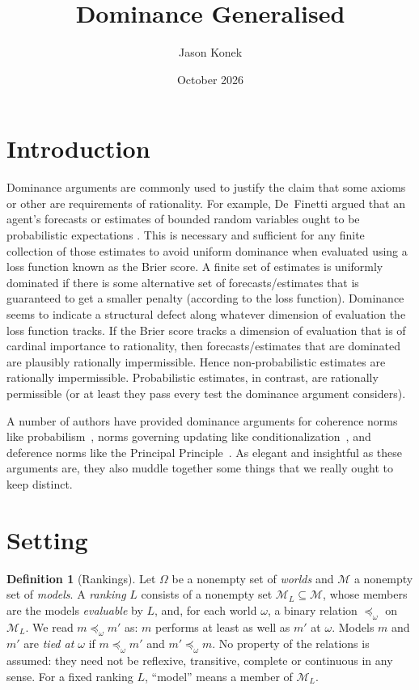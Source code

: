 \documentclass[11pt]{article}
\title{Dominance Generalised}
\author{Jason Konek}
\date{October 2026}
\theoremstyle{definition}
\newtheorem{definition}[theorem]{Definition}
\theoremstyle{remark}
\newcommand{\M}{\mathcal M}
\begin{document}
\maketitle

\section{Introduction}


Dominance arguments are commonly used to justify the claim that some axioms or other are requirements of rationality. For example, De~Finetti argued that an agent's forecasts or estimates of bounded random variables ought to be probabilistic expectations \cite[\S1.6, \S3.3]{deFinetti1974}. This is necessary and sufficient for any finite collection of those estimates to avoid uniform dominance when evaluated using a loss function known as the Brier score. A finite set of estimates is uniformly dominated if there is some alternative set of forecasts/estimates that is guaranteed to get a smaller penalty (according to the loss function). Dominance seems to indicate a structural defect along whatever dimension of evaluation the loss function tracks. If the Brier score tracks a dimension of evaluation that is of cardinal importance to rationality, then forecasts/estimates that are dominated are plausibly rationally impermissible. Hence non-probabilistic estimates are rationally impermissible. Probabilistic estimates, in contrast, are rationally permissible (or at least they pass every test the dominance argument considers).


A number of authors have provided dominance arguments for coherence norms like probabilism~\cite{Joyce2009,Predd2009,SSK2009,Pettigrew2022,Nielsen2023}, norms governing updating like conditionalization~\cite{Briggs2020,Nielsen2021}, and deference norms like the Principal Principle~\cite[Chapter~10]{Pettigrew2016}. As elegant and insightful as these arguments are, they also muddle together some things that we really ought to keep distinct.




\section{Setting}\label{sec:setting}

\begin{definition}[Rankings]\label{def:rankings}
Let $\Omega$ be a nonempty set of \emph{worlds} and $\M$ a nonempty set of \emph{models}. A \emph{ranking} $L$ consists of a nonempty set $\M_L\subseteq\M$, whose members are the models \emph{evaluable} by $L$, and, for each world $\omega$, a binary relation $\preceq_\omega$ on $\M_L$. We read $m\preceq_\omega m'$ as: $m$ performs at least as well as $m'$ at $\omega$. Models $m$ and $m'$ are \emph{tied at $\omega$} if $m\preceq_\omega m'$ and $m'\preceq_\omega m$. No property of the relations is assumed: they need not be reflexive, transitive, complete or continuous in any sense. For a fixed ranking $L$, ``model'' means a member of $\M_L$.
\end{definition}
\end{document}
